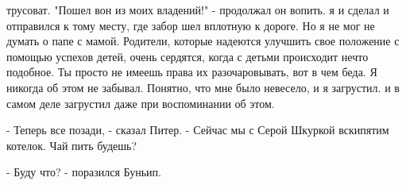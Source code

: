 трусоват. "Пошел вон из моих владений!" - продолжал он вопить.
 я и сделал и отправился к тому месту, где забор шел вплотную к 
дороге. Но я не мог не думать о папе с мамой. Родители, которые 
надеются улучшить свое положение с помощью успехов детей, очень 
сердятся, когда с детьми происходит нечто подобное. Ты просто не 
имеешь права их разочаровывать, вот в чем беда. Я никогда об этом не 
забывал. Понятно, что мне было невесело, и я загрустил.
 и в самом деле загрустил даже при воспоминании об этом.
\par- Теперь все позади, - сказал Питер. - Сейчас мы с Серой Шкуркой 
вскипятим котелок. Чай пить будешь?
\par- Буду что? - поразился Буньип.
\par